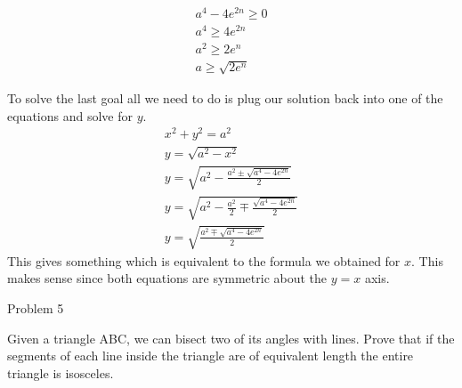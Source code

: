 \documentclass{report}
\begin{document}
\begin{description}
\begin{mdframed}
            \begin{gather}
                a^4 - 4e^{2n} \ge 0\\ 
                a^4 \ge 4e^{2n}\\
                a^2 \ge 2e^n\\
                a \ge \sqrt{2e^n}
            \end{gather}
        \end{mdframed}
        \pagebreak
        \begin{mdframed}
            To solve the last goal all we need to do is plug
            our solution back into one of the equations and solve
            for $y$.
            \begin{gather}
                x^2 + y^2 = a^2\\
                y = \sqrt{a^2-x^2}\\
                y = \sqrt{a^2 - \frac{a^2 \pm \sqrt{a^4 - 4e^{2n}}} {2}}\\
                y = \sqrt{a^2 - \frac{a^2}{2} \mp \frac{\sqrt{a^4-4e^{2n}}}{2}}\\
                y = \sqrt{\frac{a^2 \mp \sqrt{a^4-4e^{2n}}}{2}}
            \end{gather}
            This gives something which is equivalent to the formula
            we obtained for $x$. This makes sense since both equations
            are symmetric about the $y = x$ axis.
        \end{mdframed}
    \item {\large Problem 5}
        \begin{mdframed}
            Given a triangle ABC, we can bisect two of its
            angles with lines. Prove that if the segments
            of each line inside the triangle are of equivalent
            length the entire triangle is isosceles.

            \begin{center}
                

\end{center}
\end{mdframed}
\end{description}
\end{document}
